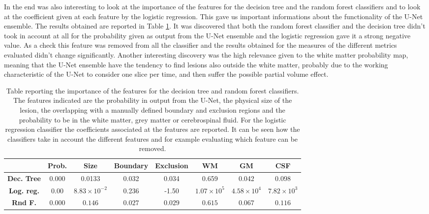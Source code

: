 \documentclass{standalone}
\begin{document}
In the end was also interesting to look at the importance of the features for the decision tree and the random forest classifiers and to look at the coefficient given at each feature by the logistic regression. This gave us important informations about the functionality of the U-Net ensemble. The results obtained are reported in Table \ref{tab:feature_importance}.
It was discovered that both the random forest classifier and the decision tree didn't took in account at all for the probability given as output from the U-Net ensemble and the logistic regression gave it a strong negative value.
As a check this feature was removed from all the classifier and the results obtained for the measures of the different metrics evaluated didn't change significantly. 
Another interesting discovery was the high relevance given to the white matter probability map, meaning that the U-Net ensemble have the tendency to find lesions also outside the white matter, probably due to the working characteristic of the U-Net to consider one slice per time, and then suffer the possible partial volume effect.


\begin{table}[h!]
\centering
\small
\setlength\tabcolsep{1pt}
\begin{tabular}{c|ccccccc}
                & \textbf{Prob.}     & \textbf{Size}        & \textbf{Boundary}     & \textbf{Exclusion} & \textbf{WM}       & \textbf{GM}        & \textbf{CSF}       \\ \hline
\textbf{Dec. Tree} & 0.000 & 0.0133 & 0.032 & 0.034 & 0.659 & 0.042 & 0.098 \\
\textbf{Log. reg.} & 0.00 & $8.83 \times 10^{-2}$ & 0.236 & -1.50 & $1.07 \times 10^5 $ & $4.58 \times 10^4$ & $7.82 \times 10^3$ \\
\textbf{Rnd F.} & $0.000$ & $0.146$ & $0.027$ & $0.029$  & $0.615$ & $0.067$ & $0.116$
\end{tabular}
\caption{Table reporting the importance of the features for the decision tree and random forest classifiers. 
The features indicated are the probability in output from the U-Net, the physical size of the lesion, the overlapping with a manually defined boundary and exclusion regions and the probability to be in the white matter, grey matter or cerebrospinal fluid.
For the logistic regression classifier the coefficients associated at the features are reported. It can be seen how the classifiers take in account the different features and for example evaluating which feature can be removed.}
\label{tab:feature_importance}
\end{table}
\end{document}
